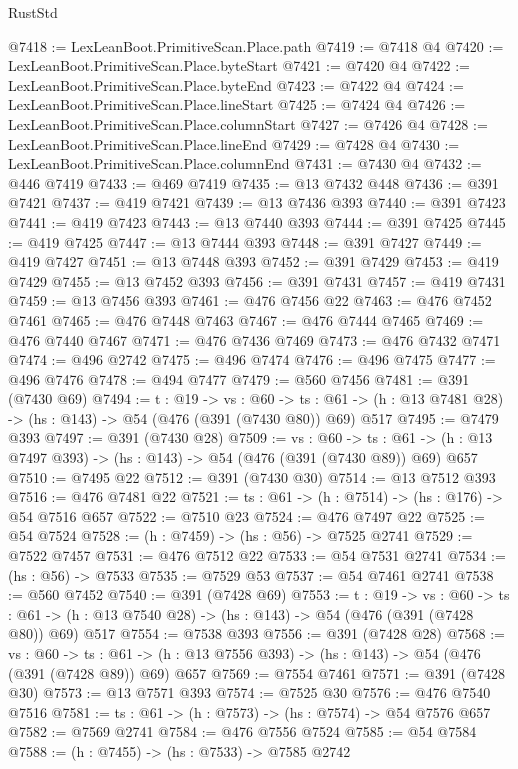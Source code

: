 \begin{lexlean}{RustStd}
\begin{coremodule}
@7418 := LexLeanBoot.PrimitiveScan.Place.path
@7419 := @7418 @4
@7420 := LexLeanBoot.PrimitiveScan.Place.byteStart
@7421 := @7420 @4
@7422 := LexLeanBoot.PrimitiveScan.Place.byteEnd
@7423 := @7422 @4
@7424 := LexLeanBoot.PrimitiveScan.Place.lineStart
@7425 := @7424 @4
@7426 := LexLeanBoot.PrimitiveScan.Place.columnStart
@7427 := @7426 @4
@7428 := LexLeanBoot.PrimitiveScan.Place.lineEnd
@7429 := @7428 @4
@7430 := LexLeanBoot.PrimitiveScan.Place.columnEnd
@7431 := @7430 @4
@7432 := @446 @7419
@7433 := @469 @7419
@7435 := @13 @7432 @448
@7436 := @391 @7421
@7437 := @419 @7421
@7439 := @13 @7436 @393
@7440 := @391 @7423
@7441 := @419 @7423
@7443 := @13 @7440 @393
@7444 := @391 @7425
@7445 := @419 @7425
@7447 := @13 @7444 @393
@7448 := @391 @7427
@7449 := @419 @7427
@7451 := @13 @7448 @393
@7452 := @391 @7429
@7453 := @419 @7429
@7455 := @13 @7452 @393
@7456 := @391 @7431
@7457 := @419 @7431
@7459 := @13 @7456 @393
@7461 := @476 @7456 @22
@7463 := @476 @7452 @7461
@7465 := @476 @7448 @7463
@7467 := @476 @7444 @7465
@7469 := @476 @7440 @7467
@7471 := @476 @7436 @7469
@7473 := @476 @7432 @7471
@7474 := @496 @2742
@7475 := @496 @7474
@7476 := @496 @7475
@7477 := @496 @7476
@7478 := @494 @7477
@7479 := @560 @7456
@7481 := @391 (@7430 @69)
@7494 := {t : @19} ->
  {vs : @60} ->
  {ts : @61} -> (h : @13 @7481 @28) -> (hs : @143) -> @54 (@476 (@391 (@7430 @80)) @69) @517
@7495 := @7479 @393
@7497 := @391 (@7430 @28)
@7509 := {vs : @60} ->
  {ts : @61} -> (h : @13 @7497 @393) -> (hs : @143) -> @54 (@476 (@391 (@7430 @89)) @69) @657
@7510 := @7495 @22
@7512 := @391 (@7430 @30)
@7514 := @13 @7512 @393
@7516 := @476 @7481 @22
@7521 := {ts : @61} -> (h : @7514) -> (hs : @176) -> @54 @7516 @657
@7522 := @7510 @23
@7524 := @476 @7497 @22
@7525 := @54 @7524
@7528 := (h : @7459) -> (hs : @56) -> @7525 @2741
@7529 := @7522 @7457
@7531 := @476 @7512 @22
@7533 := @54 @7531 @2741
@7534 := (hs : @56) -> @7533
@7535 := @7529 @53
@7537 := @54 @7461 @2741
@7538 := @560 @7452
@7540 := @391 (@7428 @69)
@7553 := {t : @19} ->
  {vs : @60} ->
  {ts : @61} -> (h : @13 @7540 @28) -> (hs : @143) -> @54 (@476 (@391 (@7428 @80)) @69) @517
@7554 := @7538 @393
@7556 := @391 (@7428 @28)
@7568 := {vs : @60} ->
  {ts : @61} -> (h : @13 @7556 @393) -> (hs : @143) -> @54 (@476 (@391 (@7428 @89)) @69) @657
@7569 := @7554 @7461
@7571 := @391 (@7428 @30)
@7573 := @13 @7571 @393
@7574 := @7525 @30
@7576 := @476 @7540 @7516
@7581 := {ts : @61} -> (h : @7573) -> (hs : @7574) -> @54 @7576 @657
@7582 := @7569 @2741
@7584 := @476 @7556 @7524
@7585 := @54 @7584
@7588 := (h : @7455) -> (hs : @7533) -> @7585 @2742

\end{coremodule}
\end{lexlean}

